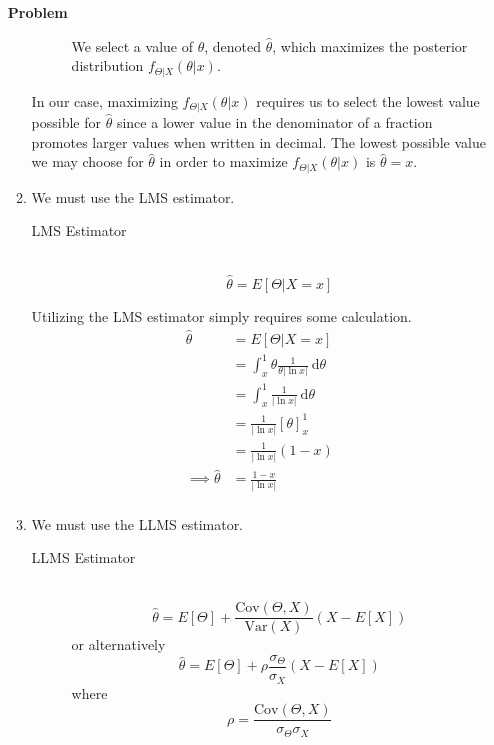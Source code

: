 \documentclass[12pt]{article}
\newenvironment{Ex}{\textbf{Problem}\vspace{.75em}\\}{}
\newcommand{\dd}[1]{\:\mathrm{d}{#1}}
\begin{document}
\begin{enumerate}
\begin{Ex}
\begin{solution}
\begin{enumerate}
\begin{mdframed}[backgroundcolor=silver]
\begin{description}
            We select a value of $\theta$, denoted $\hat{\theta}$,
            which maximizes the posterior distribution
            $f_{\Theta|X}(\theta|x)$.
          \end{description}
        \end{mdframed}
        In our case, maximizing $f_{\Theta|X}(\theta|x)$ requires us
        to select the lowest value possible for $\hat{\theta}$ since a
        lower value in the denominator of a fraction promotes larger
        values when written in decimal. The lowest possible value we
        may choose for $\hat{\theta}$ in order to maximize
        $f_{\Theta|X}(\theta|x)$ is $\hat{\theta}=x$.
      \item We must use the LMS estimator.
        \begin{mdframed}[backgroundcolor=silver]
          \begin{description}
          \item[LMS Estimator] \hfill \\
            $$\hat{\theta} = E[\Theta|X=x]$$
          \end{description}
        \end{mdframed}
        Utilizing the LMS estimator simply requires some calculation.
        \begin{equation}
          \label{eq:4c-sol}
          \begin{aligned}
            \hat{\theta} &= E[\Theta|X=x] \\
            &= \int_x^1 \theta \frac{1}{\theta|\ln x|} \dd{\theta} \\
            &= \int_x^1 \frac{1}{|\ln x|} \dd{\theta} \\
            &= \frac{1}{|\ln x|} [\theta]_x^1 \\
            &= \frac{1}{|\ln x|} (1-x) \\
            \implies \hat{\theta} &= \frac{1-x}{|\ln x|} \\
          \end{aligned}
        \end{equation}
      \item  We must use the LLMS estimator.
        \begin{mdframed}[backgroundcolor=silver]
          \begin{description}
          \item[LLMS Estimator] \hfill \\
            $$\hat{\theta} = E[\Theta]+
            \frac{\text{Cov}(\Theta,X)}{\text{Var}(X)}
            (X-E[X])$$
            or alternatively
            $$\hat{\theta} = E[\Theta]+
            \rho\frac{\sigma_{\Theta}}{\sigma_{X}}(X-E[X])$$
            where
            $$\rho =
            \frac{\text{Cov}(\Theta,X)}{\sigma_{\Theta}\sigma_{X}}$$
          \end{description}
        \end{mdframed}


\end{enumerate}
\end{solution}
\end{Ex}
\end{enumerate}
\end{document}
